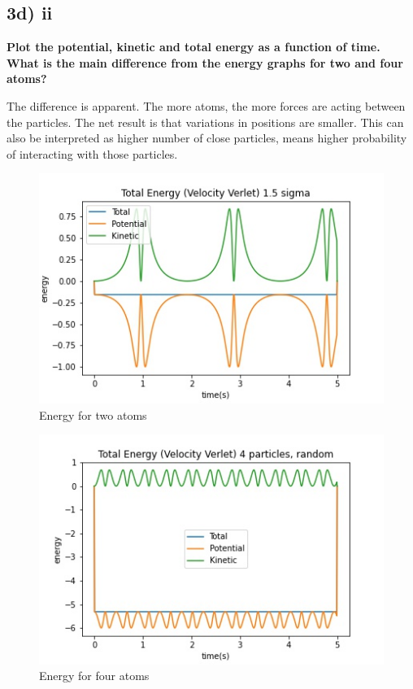 \subsection*{3d) ii}
\textbf{Plot the potential, kinetic and total energy as a function of time. What is the main difference
from the energy graphs for two and four atoms?
}

The difference is apparent. The more atoms, the more forces are acting between the particles. The net result is that variations in positions are smaller. This can also be interpreted as higher number of close particles, means higher probability of interacting with those particles.

\begin{figure}[h!]
        \centering 
        \includegraphics[scale=0.6]{./py/3dii_energy_two.jpg} 
        \caption{Energy for two atoms}
        \label{fig:3di_2}
\end{figure}
\begin{figure}[h!]
        \centering 
        \includegraphics[scale=0.6]{./py/3dii_energy_four.jpg} 
        \caption{Energy for four atoms}
        \label{fig:3di_2}
\end{figure}


